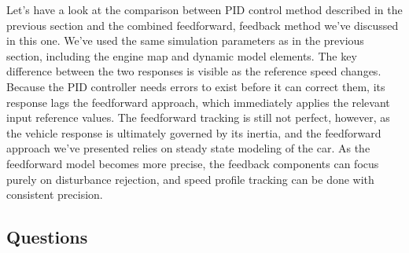 Let's have a look at
the comparison between PID control method described
in the previous section and the combined feedforward, feedback
method we've discussed in this one. We've used the same simulation
parameters as in the previous section, including the engine map and
dynamic model elements. The key difference between
the two responses is visible as the reference speed changes. Because the PID controller needs errors
to exist before it can correct them, its response lags
the feedforward approach, which immediately applies
the relevant input reference values. The feedforward tracking is still not
perfect, however, as the vehicle response is ultimately governed by its inertia, and
the feedforward approach we've presented relies on steady state
modeling of the car. As the feedforward model
becomes more precise, the feedback components can focus
purely on disturbance rejection, and speed profile tracking can be
done with consistent precision. 


\subsection{Questions}
\label{questions_longitudinal_control}

